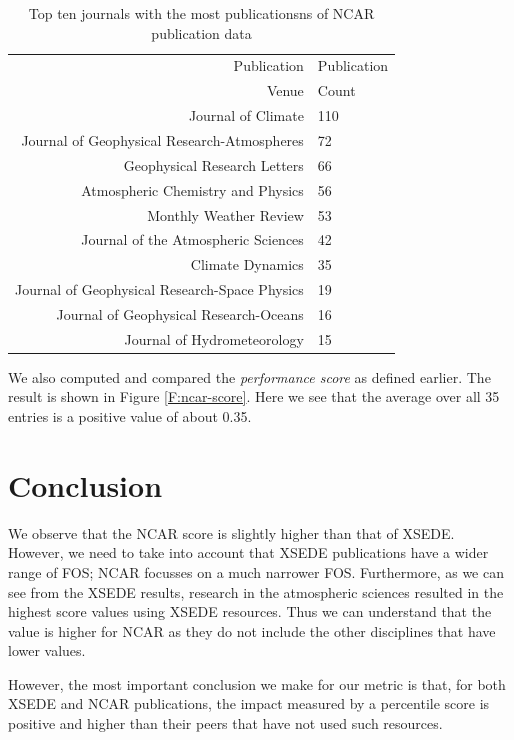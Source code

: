 \documentclass{sig-alternate}
\begin{document}
\begin{table}[h]
\caption{Top ten journals with the most publicationsns of NCAR
  publication data}
\label{T:ncar-pub-count-venue}
{\small
\begin{tabular}{rl}
Publication & Publication\\
Venue & Count \\
\hline
 Journal of Climate & 110	\\
 Journal of Geophysical Research-Atmospheres & 72	\\
 Geophysical Research Letters & 66	\\
 Atmospheric Chemistry and Physics & 56	\\
 Monthly Weather Review & 53	\\
 Journal of the Atmospheric Sciences & 42	\\
 Climate Dynamics & 35	\\
 Journal of Geophysical Research-Space Physics & 19	\\
 Journal of Geophysical Research-Oceans & 16	\\
 Journal of Hydrometeorology & 15	\\
\end{tabular}
}
\end{table}

We also computed and compared the \emph{performance score} as defined earlier. The result is shown in Figure \ref{F:ncar-score}. Here we see that the average over all 35 entries is a positive value of about 0.35. 

\section{Conclusion} \label{S:conclusion}

We observe that the NCAR score is slightly higher than that of XSEDE. However, we need to take into account that XSEDE publications have a wider range of FOS; NCAR focusses on a much narrower FOS. Furthermore, as we can see from the XSEDE results, research in the atmospheric sciences resulted in the highest score values using XSEDE resources. Thus we can understand that the value is higher for NCAR as they do not include the other disciplines that have lower values.

However, the most important conclusion we make for our metric is that, for both XSEDE and NCAR publications, the impact measured by a percentile score is positive and higher than their peers that have not used such resources. 
\end{document}
